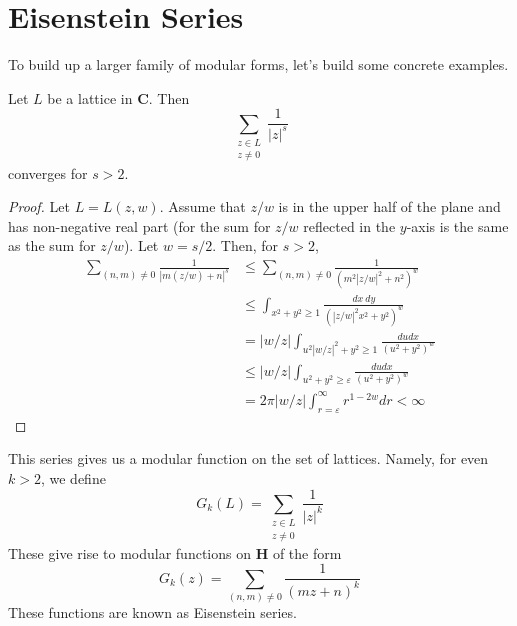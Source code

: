 \section{Eisenstein Series}

To build up a larger family of modular forms, let's build some concrete examples.

\begin{lemma}
    Let $L$ be a lattice in $\mathbf{C}$. Then
    \[ \sum_{\substack{z \in L \\ z \neq 0}} \frac{1}{|z|^s} \]
    converges for $s > 2$.
\end{lemma}
\begin{proof}
    Let $L = L(z,w)$. Assume that $z/w$ is in the upper half of the plane and has non-negative real part (for the sum for $z/w$ reflected in the $y$-axis is the same as the sum for $z/w$). Let $w = s/2$. Then, for $s > 2$,
    \begin{align*}
        \sum_{(n,m) \neq 0} \frac{1}{|m(z/w) + n|^s} &\leq \sum_{(n,m) \neq 0} \frac{1}{(m^2|z/w|^2 + n^2)^w}\\
        &\leq \int_{x^2 + y^2 \geq 1} \frac{dx\ dy}{(|z/w|^2 x^2 + y^2)^w}\\
        &= |w/z| \int_{u^2 |w/z|^2 + y^2 \geq 1} \frac{du dx}{(u^2 + y^2)^w}\\
        &\leq |w/z| \int_{u^2 + y^2 \geq \varepsilon} \frac{du dx}{(u^2 + y^2)^w}\\
        &= 2 \pi |w/z| \int_{r = \varepsilon}^\infty r^{1-2w} dr < \infty
    \end{align*}
\end{proof}

This series gives us a modular function on the set of lattices. Namely, for even $k > 2$, we define
%
\[ G_k(L) = \sum_{\substack{z \in L \\ z \neq 0}} \frac{1}{|z|^k} \]
%
These give rise to modular functions on $\mathbf{H}$ of the form
%
\[ G_k(z) = \sum_{(n,m) \neq 0} \frac{1}{(mz + n)^{k}} \]
%
These functions are known as Eisenstein series.

